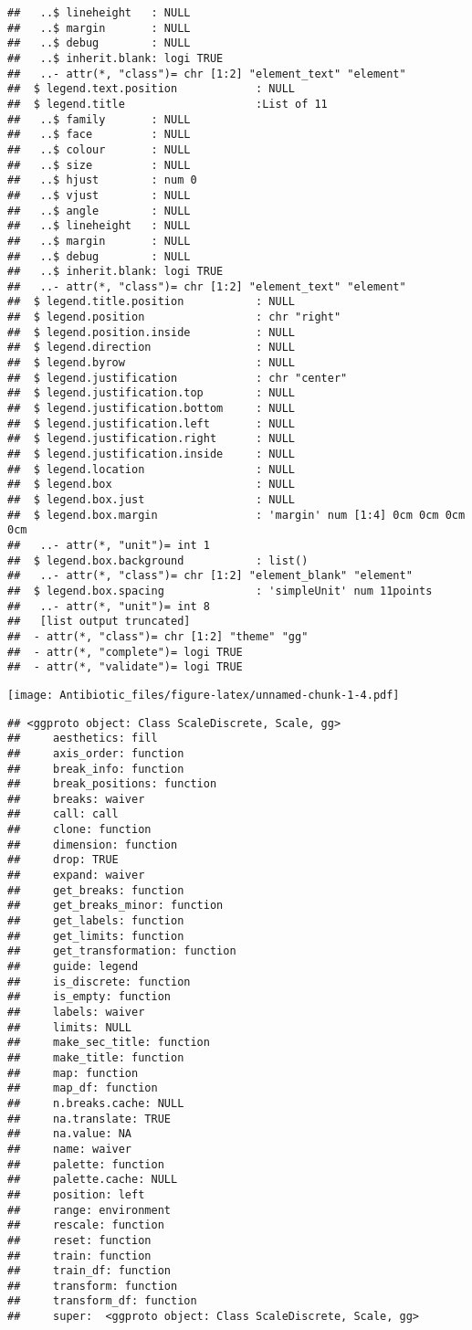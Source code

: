 \documentclass[
]{article}
\begin{document}
\begin{verbatim}
##   ..$ lineheight   : NULL
##   ..$ margin       : NULL
##   ..$ debug        : NULL
##   ..$ inherit.blank: logi TRUE
##   ..- attr(*, "class")= chr [1:2] "element_text" "element"
##  $ legend.text.position            : NULL
##  $ legend.title                    :List of 11
##   ..$ family       : NULL
##   ..$ face         : NULL
##   ..$ colour       : NULL
##   ..$ size         : NULL
##   ..$ hjust        : num 0
##   ..$ vjust        : NULL
##   ..$ angle        : NULL
##   ..$ lineheight   : NULL
##   ..$ margin       : NULL
##   ..$ debug        : NULL
##   ..$ inherit.blank: logi TRUE
##   ..- attr(*, "class")= chr [1:2] "element_text" "element"
##  $ legend.title.position           : NULL
##  $ legend.position                 : chr "right"
##  $ legend.position.inside          : NULL
##  $ legend.direction                : NULL
##  $ legend.byrow                    : NULL
##  $ legend.justification            : chr "center"
##  $ legend.justification.top        : NULL
##  $ legend.justification.bottom     : NULL
##  $ legend.justification.left       : NULL
##  $ legend.justification.right      : NULL
##  $ legend.justification.inside     : NULL
##  $ legend.location                 : NULL
##  $ legend.box                      : NULL
##  $ legend.box.just                 : NULL
##  $ legend.box.margin               : 'margin' num [1:4] 0cm 0cm 0cm 0cm
##   ..- attr(*, "unit")= int 1
##  $ legend.box.background           : list()
##   ..- attr(*, "class")= chr [1:2] "element_blank" "element"
##  $ legend.box.spacing              : 'simpleUnit' num 11points
##   ..- attr(*, "unit")= int 8
##   [list output truncated]
##  - attr(*, "class")= chr [1:2] "theme" "gg"
##  - attr(*, "complete")= logi TRUE
##  - attr(*, "validate")= logi TRUE
\end{verbatim}

\texttt{[image: Antibiotic\_files/figure-latex/unnamed-chunk-1-4.pdf]}

\begin{verbatim}
## <ggproto object: Class ScaleDiscrete, Scale, gg>
##     aesthetics: fill
##     axis_order: function
##     break_info: function
##     break_positions: function
##     breaks: waiver
##     call: call
##     clone: function
##     dimension: function
##     drop: TRUE
##     expand: waiver
##     get_breaks: function
##     get_breaks_minor: function
##     get_labels: function
##     get_limits: function
##     get_transformation: function
##     guide: legend
##     is_discrete: function
##     is_empty: function
##     labels: waiver
##     limits: NULL
##     make_sec_title: function
##     make_title: function
##     map: function
##     map_df: function
##     n.breaks.cache: NULL
##     na.translate: TRUE
##     na.value: NA
##     name: waiver
##     palette: function
##     palette.cache: NULL
##     position: left
##     range: environment
##     rescale: function
##     reset: function
##     train: function
##     train_df: function
##     transform: function
##     transform_df: function
##     super:  <ggproto object: Class ScaleDiscrete, Scale, gg>
\end{verbatim}
\end{document}
